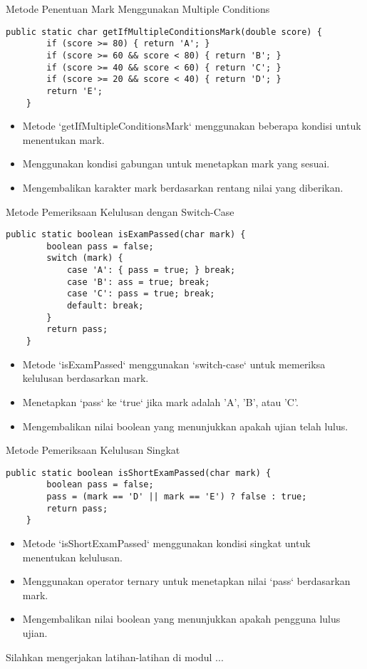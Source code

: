 \documentclass[aspectratio=169, table]{beamer}
\begin{document}
\begin{frame}[fragile]{\Large{Metode Penentuan Mark Menggunakan Multiple Conditions}}
\begin{lstlisting}[style=JavaStyle]
	public static char getIfMultipleConditionsMark(double score) {
		if (score >= 80) { return 'A'; }
		if (score >= 60 && score < 80) { return 'B'; }
		if (score >= 40 && score < 60) { return 'C'; }
		if (score >= 20 && score < 40) { return 'D'; }
		return 'E';
	}
\end{lstlisting}
\begin{itemize}
	\item Metode `getIfMultipleConditionsMark` menggunakan beberapa kondisi untuk menentukan mark.
	\item Menggunakan kondisi gabungan untuk menetapkan mark yang sesuai.
	\item Mengembalikan karakter mark berdasarkan rentang nilai yang diberikan.
\end{itemize}
\end{frame}

\begin{frame}[fragile]{\Large{Metode Pemeriksaan Kelulusan dengan Switch-Case}}
\vspace{20pt}
\begin{lstlisting}[style=JavaStyle]
	public static boolean isExamPassed(char mark) {
		boolean pass = false;
		switch (mark) {
			case 'A': { pass = true; } break;
			case 'B': ass = true; break;
			case 'C': pass = true; break;
			default: break;
		}
		return pass;
	}
\end{lstlisting}
\begin{itemize}
	\item Metode `isExamPassed` menggunakan `switch-case` untuk memeriksa kelulusan berdasarkan mark.
	\item Menetapkan `pass` ke `true` jika mark adalah 'A', 'B', atau 'C'.
	\item Mengembalikan nilai boolean yang menunjukkan apakah ujian telah lulus.
\end{itemize}
\end{frame}

\begin{frame}[fragile]{Metode Pemeriksaan Kelulusan Singkat}
\begin{lstlisting}[style=JavaStyle]
	public static boolean isShortExamPassed(char mark) {
		boolean pass = false;
		pass = (mark == 'D' || mark == 'E') ? false : true;
		return pass;
	}
\end{lstlisting}
\begin{itemize}
	\item Metode `isShortExamPassed` menggunakan kondisi singkat untuk menentukan kelulusan.
	\item Menggunakan operator ternary untuk menetapkan nilai `pass` berdasarkan mark.
	\item Mengembalikan nilai boolean yang menunjukkan apakah pengguna lulus ujian.
\end{itemize}
\end{frame}

\begin{frame}
\centering
\Huge Silahkan mengerjakan latihan-latihan di modul ...
\end{frame}
\end{document}
